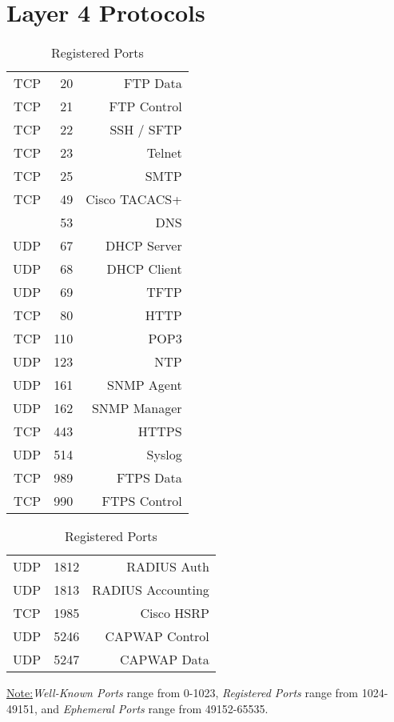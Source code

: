 \documentclass[12pt]{article}
\newif\ifcolor											%
\newcommand{\note}[1]{\ifcolor \colorbox{#1}{Note:}\else \underline{Note:}\fi}
\begin{document}
\section{Layer 4 Protocols \label{sec:L4}}
	\begin{table}[H]
	\begin{minipage}[t]{.45\linewidth}
	\centering
	\caption{Well-Known Ports \label{tab:L4 PORTS KNOWN}}
	\begin{tabular}{| r @{ } r | r |}\hline
	TCP	& 20		& FTP Data\\
	TCP	& 21		& FTP Control\\\hline
	TCP	& 22		& SSH / SFTP\\\hline
	TCP	& 23		& Telnet\\\hline
	TCP	& 25		& SMTP\\\hline
	TCP	& 49		& Cisco TACACS+\\\hline
	       	& 53		& DNS\\\hline
	UDP	& 67		& DHCP Server\\
	UDP	& 68		& DHCP Client\\\hline
	UDP	& 69		& TFTP\\\hline
	TCP	& 80		& HTTP\\\hline
	TCP	& 110		& POP3\\\hline
	UDP	& 123		& NTP\\\hline
	UDP	& 161		& SNMP Agent\\
	UDP	& 162		& SNMP Manager\\\hline
	TCP	& 443		& HTTPS\\\hline
	UDP	& 514		& Syslog\\\hline
	TCP	& 989		& FTPS Data\\
	TCP	& 990		& FTPS Control\\\hline
	\end{tabular}\end{minipage}\hfill
	\begin{minipage}[t]{.45\linewidth}
	\centering
	\caption{Registered Ports \label{tab:L4 PORTS REGISTERED}}
	\begin{tabular}{| c @{ } r | r |}\hline
	UDP	& 1812	& RADIUS Auth\\
	UDP	& 1813	& RADIUS Accounting\\\hline
	TCP	& 1985	& Cisco HSRP\\\hline
	UDP	& 5246	& CAPWAP Control\\
	UDP	& 5247	& CAPWAP Data\\\hline
	\end{tabular}\end{minipage}\end{table}
	\note{Goldenrod}\textit{Well-Known Ports} range from 0-1023, \textit{Registered Ports} range from 1024-49151, and \textit{Ephemeral Ports} range from 49152-65535.
\end{document}
